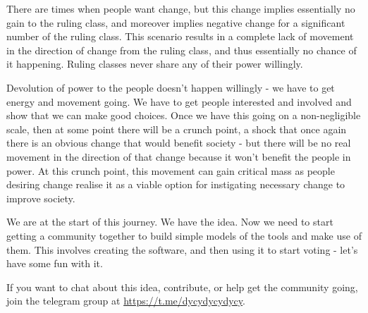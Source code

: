 \documentclass[twoside]{article}
\theoremstyle{definition}
\begin{document}
There are times when people want change, but this change implies essentially no gain to the ruling class, and moreover implies negative change for a significant number of the ruling class. This scenario results in a complete lack of movement in the direction of change from the ruling class, and thus essentially no chance of it happening. Ruling classes never share any of their power willingly.

Devolution of power to the people doesn’t happen willingly - we have to get energy and movement going. We have to get people interested and involved and show that we can make good choices. Once we have this going on a non-negligible scale, then at some point there will be a crunch point, a shock that once again there is an obvious change that would benefit society - but there will be no real movement in the direction of that change because it won’t benefit the people in power. At this crunch point, this movement can gain critical mass as people desiring change realise it as a viable option for instigating necessary change to improve society.

We are at the start of this journey. We have the idea. Now we need to start getting a community together to build simple models of the tools and make use of them. This involves creating the software, and then using it to start voting - let’s have some fun with it.

If you want to chat about this idea, contribute, or help get the community going, join the telegram group at \url{https://t.me/dycydycydycy}.
	
	
	
\end{document}

